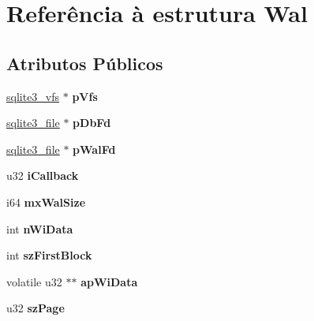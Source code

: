 \hypertarget{struct_wal}{\section{Referência à estrutura Wal}
\label{struct_wal}
}
\subsection*{Atributos Públicos}
\begin{DoxyCompactItemize}
\item 
\hypertarget{struct_wal_a5431b060acbc998a7e3710587abaa11e}{\hyperlink{structsqlite3__vfs}{sqlite3\-\_\-vfs} $\ast$ {\bfseries p\-Vfs}}\label{struct_wal_a5431b060acbc998a7e3710587abaa11e}

\item 
\hypertarget{struct_wal_a3a4d051c55228e554b36691c5095ed14}{\hyperlink{structsqlite3__file}{sqlite3\-\_\-file} $\ast$ {\bfseries p\-Db\-Fd}}\label{struct_wal_a3a4d051c55228e554b36691c5095ed14}

\item 
\hypertarget{struct_wal_aea2a72ead42cfe57e3a6809e80884397}{\hyperlink{structsqlite3__file}{sqlite3\-\_\-file} $\ast$ {\bfseries p\-Wal\-Fd}}\label{struct_wal_aea2a72ead42cfe57e3a6809e80884397}

\item 
\hypertarget{struct_wal_aae230a2317817739a5f08ebb28b644b0}{u32 {\bfseries i\-Callback}}\label{struct_wal_aae230a2317817739a5f08ebb28b644b0}

\item 
\hypertarget{struct_wal_a413f9f82c15d31627a2ed6eac9b6cc27}{i64 {\bfseries mx\-Wal\-Size}}\label{struct_wal_a413f9f82c15d31627a2ed6eac9b6cc27}

\item 
\hypertarget{struct_wal_ae3e69420adab92acd90dd7c03d37815f}{int {\bfseries n\-Wi\-Data}}\label{struct_wal_ae3e69420adab92acd90dd7c03d37815f}

\item 
\hypertarget{struct_wal_a901c02626270f4d51db89786e4994da9}{int {\bfseries sz\-First\-Block}}\label{struct_wal_a901c02626270f4d51db89786e4994da9}

\item 
\hypertarget{struct_wal_a2b0078e3adfd1fb21794561bb12bbfac}{volatile u32 $\ast$$\ast$ {\bfseries ap\-Wi\-Data}}\label{struct_wal_a2b0078e3adfd1fb21794561bb12bbfac}

\item 
\hypertarget{struct_wal_a771c3a8c81326babc7d623255a6034c5}{u32 {\bfseries sz\-Page}}\label{struct_wal_a771c3a8c81326babc7d623255a6034c5}


\end{DoxyCompactItemize}
